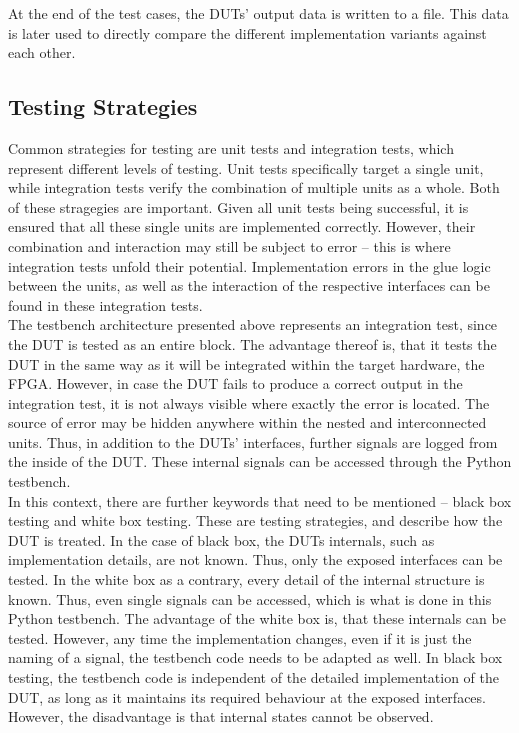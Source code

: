 At the end of the test cases, the DUTs' output data is written to a file.
This data is later used to directly compare the different implementation variants against each other.

\subsection{Testing Strategies}

Common strategies for testing are unit tests and integration tests, which represent different levels of testing.
Unit tests specifically target a single unit, while integration tests verify the combination of multiple units as a whole.
Both of these stragegies are important.
Given all unit tests being successful, it is ensured that all these single units are implemented correctly.
However, their combination and interaction may still be subject to error -- this is where integration tests unfold their potential.
Implementation errors in the glue logic between the units, as well as the interaction of the respective interfaces can be found in these integration tests.\\

The testbench architecture presented above represents an integration test, since the DUT is tested as an entire block.
The advantage thereof is, that it tests the DUT in the same way as it will be integrated within the target hardware, the FPGA.
However, in case the DUT fails to produce a correct output in the integration test, it is not always visible where exactly the error is located.
The source of error may be hidden anywhere within the nested and interconnected units.
Thus, in addition to the DUTs' interfaces, further signals are logged from the inside of the DUT.
These internal signals can be accessed through the Python testbench.\\

In this context, there are further keywords that need to be mentioned -- black box testing and white box testing.
These are testing strategies, and describe how the DUT is treated.
In the case of black box, the DUTs internals, such as implementation details, are not known.
Thus, only the exposed interfaces can be tested.
In the white box as a contrary, every detail of the internal structure is known.
Thus, even single signals can be accessed, which is what is done in this Python testbench.
The advantage of the white box is, that these internals can be tested.
However, any time the implementation changes, even if it is just the naming of a signal, the testbench code needs to be adapted as well.
In black box testing, the testbench code is independent of the detailed implementation of the DUT, as long as it maintains its required behaviour at the exposed interfaces.
However, the disadvantage is that internal states cannot be observed.\\

